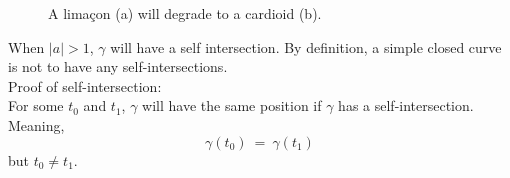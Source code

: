\documentclass[12pt]{article}
\begin{document}
\begin{figure}[h!]
  \caption*{A limaçon (a) will degrade to a cardioid (b).}
\end{figure}

When $|a|>1$, $\gamma$ will have a self intersection. By definition, a simple closed curve is not to have any self-intersections.\\

Proof of self-intersection:\\
For some $t_0$ and $t_1$, $\gamma$ will have the same position if $\gamma$ has a self-intersection. Meaning,
$$
\gamma(t_0) \ = \ \gamma(t_1)
$$
but $t_0 \neq t_1$.
\end{document}
